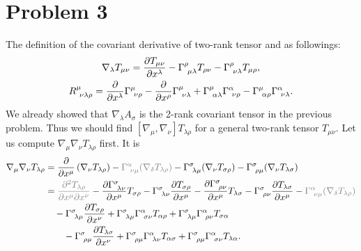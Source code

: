 \documentclass[a4paper,pdftex,10pt]{article}
\begin{document}
\clearpage
\section{Problem 3}

The definition of the covariant derivative of two-rank tensor and as followings:
\begin{gather}
  \nabla_{\lambda} T_{\mu\nu}
  =
  \pdv{T_{\mu\nu}}{x^{\lambda}}
  -
  \Gamma^{\rho}_{\ \mu\lambda}T_{\rho\nu}
  -
  \Gamma^{\rho}_{\ \nu\lambda}T_{\mu\rho}
  ,
  \\
  R^{\mu}_{\ \nu\lambda\rho}
  =
  \pdv{}{x^{\lambda}}
  \Gamma^{\mu}_{\ \nu\rho}
  -
  \pdv{}{x^{\rho}}
  \Gamma^{\mu}_{\ \nu\lambda}
  +
  \Gamma^{\mu}_{\ \alpha\lambda}\Gamma^{\alpha}_{\ \nu\rho}
  -
  \Gamma^{\mu}_{\ \alpha\rho}\Gamma^{\alpha}_{\ \nu\lambda}
  .
\end{gather}
We already showed that $\nabla_{\lambda}A_{\sigma}$ is the 2-rank covariant tensor in the previous problem. Thus we should find $[\nabla_{\mu},\nabla_{\nu}]T_{\lambda\rho}$ for a general two-rank tensor $T_{\mu\nu}$. Let us compute $\nabla_{\mu}\nabla_{\nu}T_{\lambda\rho}$ first. It is
\begin{align}
  \nabla_{\mu}\nabla_{\nu}T_{\lambda\rho}
  &=
  \pdv{}{x^{\mu}}
  \left(  \nabla_{\nu}T_{\lambda\rho} \right)
  -
  \textcolor{gray}{\Gamma^{\alpha}_{\ \nu\mu}(\nabla_{\delta}T_{\lambda\rho})}
  -
  \Gamma^{\sigma}_{\ \lambda\mu}(\nabla_{\nu}T_{\sigma\rho})
  -
  \Gamma^{\sigma}_{\ \rho\mu}(\nabla_{\nu}T_{\lambda\sigma})
  \nonumber
  \\
  &=
  \textcolor{gray}{\pdv{T_{\lambda\rho}}{x^{\mu}}{x^{\nu}}}
  -
  \pdv{\Gamma^{\sigma}_{\ \lambda\nu}}{x^{\mu}}T_{\sigma\rho}
  -
  \Gamma^{\sigma}_{\ \lambda\nu}\pdv{T_{\sigma\rho}}{x^{\mu}}
  -
  \pdv{\Gamma^{\sigma}_{\ \rho\nu}}{x^{\mu}}T_{\lambda\sigma}
  -
  \Gamma^{\sigma}_{\ \rho\nu}\pdv{T_{\lambda\sigma}}{x^{\mu}}
  -
  \textcolor{gray}{\Gamma^{\alpha}_{\ \nu\mu}(\nabla_{\delta}T_{\lambda\rho})}
  \nonumber
  \\
  &\quad
  -
  \Gamma^{\sigma}_{\ \lambda\mu}\pdv{T_{\sigma\rho}}{x^{\nu}}
  +
  \Gamma^{\sigma}_{\ \lambda\mu}\Gamma^{\alpha}_{\ \sigma\nu}T_{\alpha\rho}
  +
  \Gamma^{\sigma}_{\ \lambda\mu}\Gamma^{\alpha}_{\ \rho\nu}T_{\sigma\alpha}
  \nonumber
  \\
  &\qquad
  -
  \Gamma^{\sigma}_{\ \rho\mu}\pdv{T_{\lambda\sigma}}{x^{\nu}}
  +
  \Gamma^{\sigma}_{\ \rho\mu}\Gamma^{\alpha}_{\ \lambda\nu}T_{\alpha\sigma}
  +
  \Gamma^{\sigma}_{\ \rho\mu}\Gamma^{\alpha}_{\ \sigma\nu}T_{\lambda\alpha}
  .
  \nonumber
\end{align}
\end{document}

